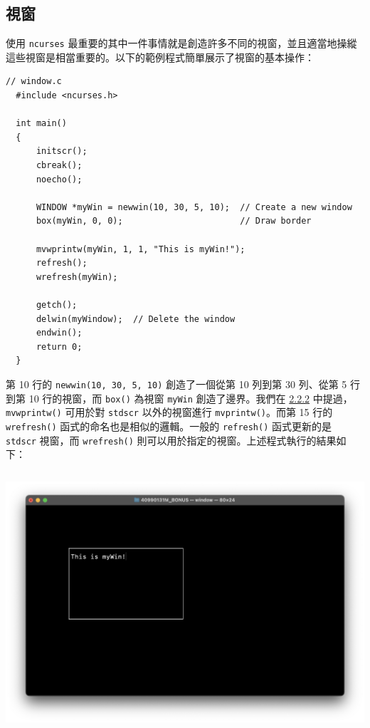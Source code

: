 \documentclass[12pt]{article}
\theoremstyle{definition}
\begin{document}
\subsection{視窗}
\noindent
使用 \texttt{ncurses} 最重要的其中一件事情就是創造許多不同的視窗，並且適當地操縱這些視窗是相當重要的。以下的範例程式簡單展示了視窗的基本操作：
\begin{lstlisting}[style=C]
  // window.c
  #include <ncurses.h>

  int main()
  {
      initscr();
      cbreak();
      noecho();
    
      WINDOW *myWin = newwin(10, 30, 5, 10);  // Create a new window
      box(myWin, 0, 0);                       // Draw border

      mvwprintw(myWin, 1, 1, "This is myWin!");
      refresh();
      wrefresh(myWin);

      getch();
      delwin(myWindow);  // Delete the window
      endwin();
      return 0;
  }
\end{lstlisting}
第 10 行的 \texttt{newwin(10, 30, 5, 10)} 創造了一個從第 10 列到第 30 列、從第 5 行到第 10 行的視窗，而 \texttt{box()} 為視窗 \texttt{myWin} 創造了邊界。我們在 \hyperlink{2.2.2a}{2.2.2} 中提過，\texttt{mvwprintw()} 可用於對 \texttt{stdscr} 以外的視窗進行 \texttt{mvprintw()}。而第 15 行的 \texttt{wrefresh()} 函式的命名也是相似的邏輯。一般的 \texttt{refresh()} 函式更新的是 \texttt{stdscr} 視窗，而 \texttt{wrefresh()} 則可以用於指定的視窗。上述程式執行的結果如下：
\begin{lstlisting}[style=zsh]
  % ./window
\end{lstlisting}
\begin{center}
    \includegraphics[width=\textwidth]{window.png}
\end{center}
\end{document}
